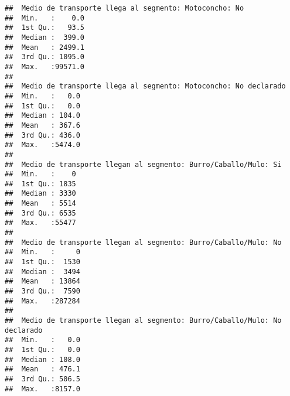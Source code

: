 \documentclass[11pt,]{article}
\begin{document}
\begin{verbatim}
##  Medio de transporte llega al segmento: Motoconcho: No
##  Min.   :    0.0                                      
##  1st Qu.:   93.5                                      
##  Median :  399.0                                      
##  Mean   : 2499.1                                      
##  3rd Qu.: 1095.0                                      
##  Max.   :99571.0                                      
##                                                       
##  Medio de transporte llega al segmento: Motoconcho: No declarado
##  Min.   :   0.0                                                 
##  1st Qu.:   0.0                                                 
##  Median : 104.0                                                 
##  Mean   : 367.6                                                 
##  3rd Qu.: 436.0                                                 
##  Max.   :5474.0                                                 
##                                                                 
##  Medio de transporte llegan al segmento: Burro/Caballo/Mulo: Si
##  Min.   :    0                                                 
##  1st Qu.: 1835                                                 
##  Median : 3330                                                 
##  Mean   : 5514                                                 
##  3rd Qu.: 6535                                                 
##  Max.   :55477                                                 
##                                                                
##  Medio de transporte llegan al segmento: Burro/Caballo/Mulo: No
##  Min.   :     0                                                
##  1st Qu.:  1530                                                
##  Median :  3494                                                
##  Mean   : 13864                                                
##  3rd Qu.:  7590                                                
##  Max.   :287284                                                
##                                                                
##  Medio de transporte llegan al segmento: Burro/Caballo/Mulo: No declarado
##  Min.   :   0.0                                                          
##  1st Qu.:   0.0                                                          
##  Median : 108.0                                                          
##  Mean   : 476.1                                                          
##  3rd Qu.: 506.5                                                          
##  Max.   :8157.0                                                          

\end{verbatim}
\end{document}
